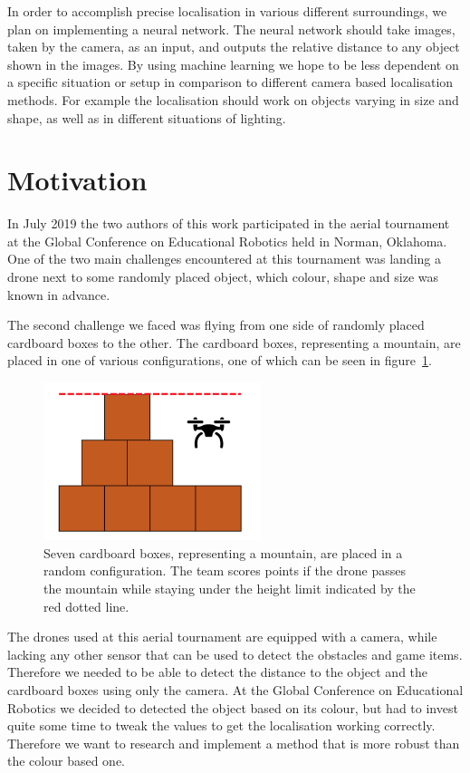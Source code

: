 In order to accomplish precise localisation in various different surroundings, we plan on implementing a neural network. The neural network should take images, taken by the camera, as an input, and outputs the relative distance to any object shown in the images. By using machine learning we hope to be less dependent on a specific situation or setup in comparison to different camera based localisation methods. For example the localisation should work on objects varying in size and shape, as well as in different situations of lighting.

\section{Motivation}
In July 2019 the two authors of this work participated in the aerial tournament at the Global Conference on Educational Robotics held in Norman, Oklahoma. One of the two main challenges encountered at this tournament was landing a drone next to some randomly placed object, which colour, shape and size was known in advance.

The second challenge we faced was flying from one side of randomly placed cardboard boxes to the other. The cardboard boxes, representing a mountain, are placed in one of various configurations, one of which can be seen in figure~\ref{pic:introduction_motivation_mountain}.

\begin{figure}[h]
	\centering
	\includegraphics[width=2.5in]{img/introduction_motivation_mountain.png}
	\caption{Seven cardboard boxes, representing a mountain, are placed in a random configuration. The team scores points if the drone passes the mountain while staying under the height limit indicated by the red dotted line.}
	\label{pic:introduction_motivation_mountain}
\end{figure}

The drones used at this aerial tournament are equipped with a camera, while lacking any other sensor that can be used to detect the obstacles and game items. Therefore we needed to be able to detect the distance to the object and the cardboard boxes using only the camera. At the Global Conference on Educational Robotics we decided to detected the object based on its colour, but had to invest quite some time to tweak the values to get the localisation working correctly. Therefore we want to research and implement a method that is more robust than the colour based one.

